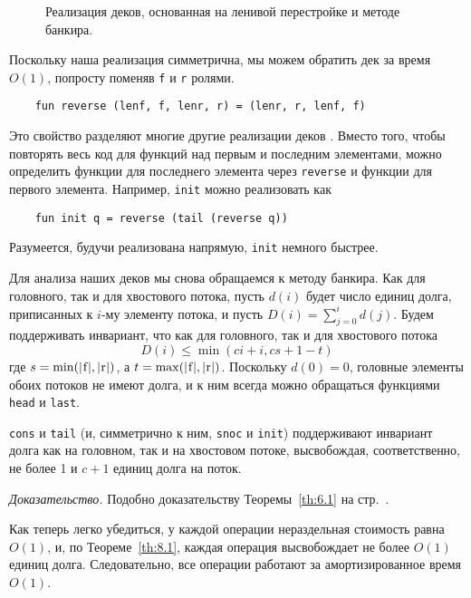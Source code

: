 \begin{figure}
  \centering
  
  \caption{Реализация деков, основанная на ленивой перестройке и методе банкира.}
  \label{fig:8.3}
\end{figure}

\begin{remark}
  Поскольку наша реализация симметрична, мы можем обратить дек за
  время $O(1)$, попросту поменяв \lstinline!f! и \lstinline!r! ролями.
  \begin{lstlisting}
    fun reverse (lenf, f, lenr, r) = (lenr, r, lenf, f)
  \end{lstlisting}
  Это свойство разделяют многие другие реализации деков
  \cite{Hoogerwoord1992, ChuangGoldberg1993}. Вместо того, чтобы
  повторять весь код для функций над первым и последним элементами,
  можно определить функции для последнего элемента через
  \lstinline!reverse! и функции для первого элемента. Например,
  \lstinline!init! можно реализовать как
  \begin{lstlisting}
    fun init q = reverse (tail (reverse q))
  \end{lstlisting}
  Разумеется, будучи реализована напрямую, \lstinline!init! немного быстрее.
\end{remark}

Для анализа наших деков мы снова обращаемся к методу банкира. Как для
головного, так и для хвостового потока, пусть $d(i)$ будет число
единиц долга, приписанных к $i$-му элементу потока, и пусть 
$D(i) = \sum_{j=0}^i d(j)$. Будем поддерживать инвариант, что как для
головного, так и для хвостового потока
$$
D(i) \le \min(ci + i, cs + 1 - t)
$$
где $s = \min(|\lstinline!f!|,|\lstinline!r!|)$, а 
$t = \max(|\lstinline!f!|, |\lstinline!r!|)$. Поскольку $d(0) = 0$,
головные элементы обоих потоков не имеют долга, и к ним всегда
можно обращаться функциями \lstinline!head! и \lstinline!last!.
\begin{theorem}\label{th:8.1}
  \lstinline!cons! и \lstinline!tail! (и, симметрично к ним,
  \lstinline!snoc! и \lstinline!init!) поддерживают инвариант долга
  как на головном, так и на хвостовом потоке, высвобождая,
  соответственно, не более 1 и $c+1$ единиц долга на поток.

  \emph{Доказательство.} Подобно доказательству Теоремы~\ref{th:6.1}
  на стр.~\pageref{th:6.1}.
\end{theorem}

Как теперь легко убедиться, у каждой операции нераздельная стоимость
равна $O(1)$, и, по Теореме~\ref{th:8.1}, каждая операция высвобождает
не более $O(1)$ единиц долга. Следовательно, все операции работают за
амортизированное время $O(1)$.

